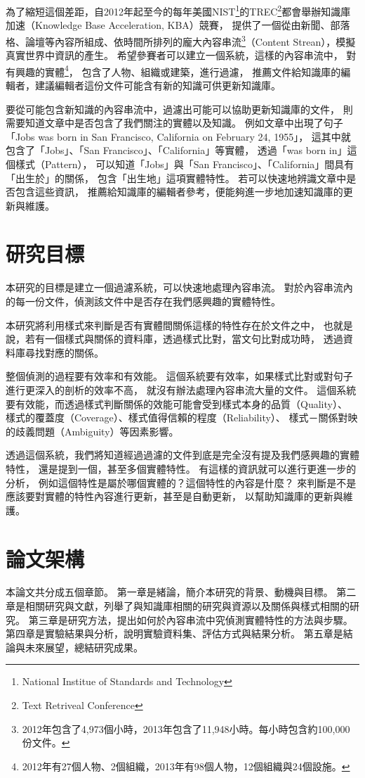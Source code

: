 為了縮短這個差距，自2012年起至今的每年美國NIST\footnote{National Institue of Standards and Technology}的TREC\footnote{Text Retriveal Conference}都會舉辦知識庫加速（Knowledge Base Acceleration, KBA）競賽，
提供了一個從由新聞、部落格、論壇等內容所組成、依時間所排列的龐大內容串流\footnote{2012年包含了4,973個小時，2013年包含了11,948小時。\citep{kba2013}每小時包含約100,000份文件。}（Content Strean），模擬真實世界中資訊的產生。
希望參賽者可以建立一個系統，這樣的內容串流中，
對有興趣的實體\footnote{2012年有27個人物、2個組織，2013年有98個人物，12個組織與24個設施。}，
包含了人物、組織或建築，進行過濾，
推薦文件給知識庫的編輯者，建議編輯者這份文件可能含有新的知識可供更新知識庫。

要從可能包含新知識的內容串流中，過濾出可能可以協助更新知識庫的文件，
則需要知道文章中是否包含了我們關注的實體以及知識。
例如文章中出現了句子「Jobs was born in San Francisco, California on February 24, 1955」，
這其中就包含了「Jobs」、「San Francisco」、「California」等實體，
透過「was born in」這個樣式（Pattern），
可以知道「Jobs」與「San Francisco」、「California」間具有「出生於」的關係，
包含「出生地」這項實體特性。
若可以快速地辨識文章中是否包含這些資訊，
推薦給知識庫的編輯者參考，便能夠進一步地加速知識庫的更新與維護。

%
%
\section{研究目標}
本研究的目標是建立一個過濾系統，可以快速地處理內容串流。
對於內容串流內的每一份文件，偵測該文件中是否存在我們感興趣的實體特性。

本研究將利用樣式來判斷是否有實體間關係這樣的特性存在於文件之中，
也就是說，若有一個樣式與關係的資料庫，透過樣式比對，當文句比對成功時，
透過資料庫尋找對應的關係。

整個偵測的過程要有效率和有效能。
這個系統要有效率，如果樣式比對或對句子進行更深入的剖析的效率不高，
就沒有辦法處理內容串流大量的文件。
這個系統要有效能，而透過樣式判斷關係的效能可能會受到樣式本身的品質（Quality）、
樣式的覆蓋度（Coverage）、樣式值得信賴的程度（Reliability）、
樣式－關係對映的歧義問題（Ambiguity）等因素影響。

透過這個系統，我們將知道經過過濾的文件到底是完全沒有提及我們感興趣的實體特性，
還是提到一個，甚至多個實體特性。
有這樣的資訊就可以進行更進一步的分析，
例如這個特性是屬於哪個實體的？這個特性的內容是什麼？
來判斷是不是應該要對實體的特性內容進行更新，甚至是自動更新，
以幫助知識庫的更新與維護。

%
%
\section{論文架構}
本論文共分成五個章節。
第一章是緒論，簡介本研究的背景、動機與目標。
第二章是相關研究與文獻，列舉了與知識庫相關的研究與資源以及關係與樣式相關的研究。
第三章是研究方法，提出如何於內容串流中究偵測實體特性的方法與步驟。
第四章是實驗結果與分析，說明實驗資料集、評估方式與結果分析。
第五章是結論與未來展望，總結研究成果。
